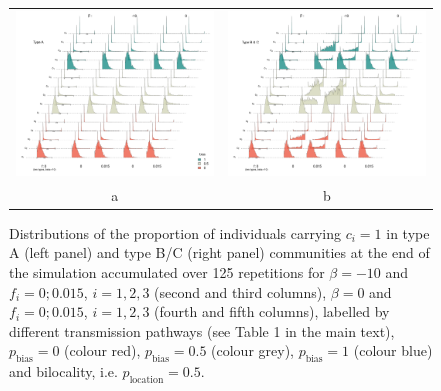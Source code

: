 \documentclass[9pt,twoside,lineno]{pnas-new}
\begin{document}
\begin{figure}[p] 
\hspace{-3cm}
    \begin{tabular}{cc}
    \includegraphics[width=.65\textwidth]{FigsSM/Figure4_rho0.5_TypeA.pdf}&
    \includegraphics[width=.65\textwidth]{FigsSM/Figure4_rho0.5_TypeB_C.pdf} \\
     a &  b\\
\end{tabular}
    \label{fig:distribBytype}
\caption{Distributions of the proportion of individuals carrying $c_i=1$ in type A (left panel) and type B/C (right panel) communities at the end of the simulation accumulated over 125 repetitions for $\beta=-10$ and $f_i=0;0.015$, $i=1,2,3$ (second and third columns), $\beta=0$ and $f_i=0;0.015$, $i=1,2,3$ (fourth and fifth columns), labelled by different transmission pathways (see Table 1 in the main text), $p_\text{bias}=0$ (colour red), $p_\text{bias}=0.5$ (colour grey), $p_\text{bias}=1$ (colour blue) and bilocality, i.e.  $p_\text{location}=0.5$.} %

\end{figure}
\end{document}
